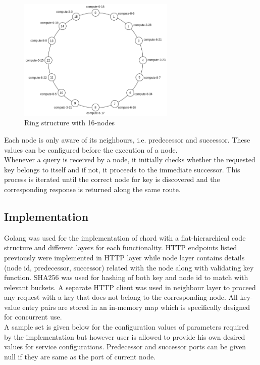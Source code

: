 \documentclass[
    a4paper,
    twocolumn,
]{article}
\begin{document}
\setlength{\intextsep}{10pt plus 2pt minus 2pt}
\begin{figure}[!ht]
	\centering
	\includegraphics[width=7.5cm]{16-structure.png}
	\caption{Ring structure with 16-nodes}
\end{figure}

Each node is only aware of its neighbours, i.e. predecessor and successor. These values can be configured before the execution of a node. \\

Whenever a query is received by a node, it initially checks whether the requested key belongs to itself and if not, it proceeds to the immediate successor. This process is iterated until the correct node for key is discovered and the corresponding response is returned along the same route. 

\subsection{Implementation}

Golang was used for the implementation of chord with a flat-hierarchical code structure and different layers for each functionality. HTTP endpoints listed previously were implemented in HTTP layer while node layer contains details (node id, predecessor, successor) related with the node along with validating key function. SHA256 was used for hashing of both key and node id to match with relevant buckets. A separate HTTP client was used in neighbour layer to proceed any request with a key that does not belong to the corresponding node. All key-value entry pairs are stored in an in-memory map which is specifically designed for concurrent use.\\

A sample set is given below for the configuration values of parameters required by the implementation but however user is allowed to provide his own desired values for service configurations. Predecessor and successor ports can be given null if they are same as the port of current node.
\end{document}

